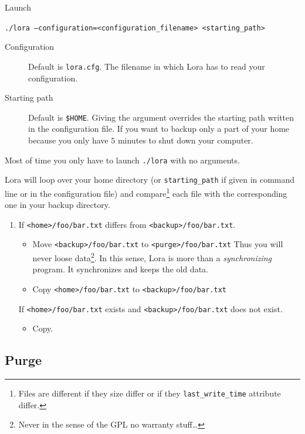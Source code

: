 \documentclass[a4paper,12pt]{article}
\newcommand{\info}[1]{\texttt{#1}}
\begin{document}
Launch
\begin{center}
      \info{./lora --configuration=<configuration\_filename>  <starting\_path>  }
\end{center}

\begin{description}
    \item[Configuration] Default is \info{lora.cfg}. The filename in which Lora has to read your configuration.
    \item[Starting path] Default is \info{\$HOME}. Giving the argument overrides the starting path written in the configuration file. If you want to backup only a part of your home because you only have \( 5\) minutes to shut down your computer.
\end{description}
Most of time you only have to launch \info{./lora} with no arguments.

Lora will loop over your home directory (or \info{starting\_path} if given in command line or in the configuration file) and compare\footnote{Files are different if they size differ or if they \info{last\_write\_time} attribute differ.} each file with the corresponding one in your backup directory. 
\begin{enumerate}
    \item
        If \info{<home>/foo/bar.txt} differs from \info{<backup>/foo/bar.txt}. 
        \begin{itemize}
            \item Move \info{<backup>/foo/bar.txt} to \info{<purge>/foo/bar.txt} Thus you will never loose data\footnote{Never in the sense of the GPL no warranty stuff\ldots}. In this sense, Lora is more than a \emph{synchronizing} program. It synchronizes and keeps the old data.
            \item Copy \info{<home>/foo/bar.txt} to \info{<backup>/foo/bar.txt}
        \end{itemize}
        If \info{<home>/foo/bar.txt} exists and \info{<backup>/foo/bar.txt} does not exist.
        \begin{itemize}
            \item Copy.
        \end{itemize}
\end{enumerate}

\subsection{Purge}
\end{document}
